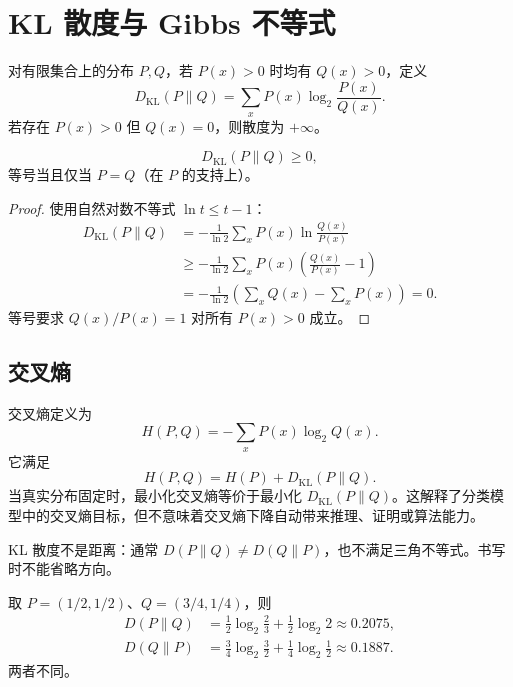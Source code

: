 \section{KL 散度与 Gibbs 不等式}

\begin{definition}[KL 散度]
对有限集合上的分布 $P,Q$，若 $P(x)>0$ 时均有 $Q(x)>0$，定义
\[
D_{\mathrm{KL}}(P\|Q)
=\sum_x P(x)\log_2\frac{P(x)}{Q(x)}.
\]
若存在 $P(x)>0$ 但 $Q(x)=0$，则散度为 $+\infty$。
\end{definition}

\begin{theorem}
\[
D_{\mathrm{KL}}(P\|Q)\ge 0,
\]
等号当且仅当 $P=Q$（在 $P$ 的支持上）。
\end{theorem}

\begin{proof}
使用自然对数不等式 $\ln t\le t-1$：
\begin{align*}
D_{\mathrm{KL}}(P\|Q)
&=-\frac1{\ln2}\sum_xP(x)\ln\frac{Q(x)}{P(x)}\\
&\ge -\frac1{\ln2}\sum_xP(x)
\left(\frac{Q(x)}{P(x)}-1\right)\\
&=-\frac1{\ln2}\left(\sum_xQ(x)-\sum_xP(x)\right)=0.
\end{align*}
等号要求 $Q(x)/P(x)=1$ 对所有 $P(x)>0$ 成立。
\end{proof}

\subsection{交叉熵}

交叉熵定义为
\[
H(P,Q)=-\sum_xP(x)\log_2Q(x).
\]
它满足
\[
H(P,Q)=H(P)+D_{\mathrm{KL}}(P\|Q).
\]
当真实分布固定时，最小化交叉熵等价于最小化 $D_{\mathrm{KL}}(P\|Q)$。这解释了分类模型中的交叉熵目标，但不意味着交叉熵下降自动带来推理、证明或算法能力。

\begin{warningbox}
KL 散度不是距离：通常 $D(P\|Q)\ne D(Q\|P)$，也不满足三角不等式。书写时不能省略方向。
\end{warningbox}

\begin{example}[KL 的不对称性]
取 $P=(1/2,1/2)$、$Q=(3/4,1/4)$，则
\begin{align*}
D(P\|Q)&=\tfrac12\log_2\tfrac23+\tfrac12\log_2 2\approx0.2075,\\
D(Q\|P)&=\tfrac34\log_2\tfrac32+\tfrac14\log_2\tfrac12\approx0.1887.
\end{align*}
两者不同。
\end{example}

